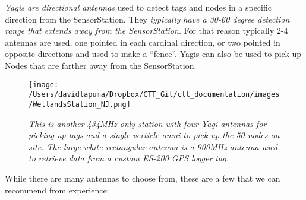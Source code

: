 \documentclass[
]{article}
\begin{document}
\emph{Yagis are directional antennas} used to detect tags and nodes in a
specific direction from the SensorStation. They \emph{typically have a
30-60 degree detection range that extends away from the SensorStation}.
For that reason typically 2-4 antennas are used, one pointed in each
cardinal direction, or two pointed in opposite directions and used to
make a ``fence''. Yagis can also be used to pick up Nodes that are
farther away from the SensorStation.

\begin{figure}
\hypertarget{id}{%
\centering
\texttt{[image: /Users/davidlapuma/Dropbox/CTT\_Git/ctt\_documentation/images/WetlandsStation\_NJ.png]}
\caption{\emph{This is another 434MHz-only station with four Yagi
antennas for picking up tags and a single verticle omni to pick up the
50 nodes on site. The large white rectangular antenna is a 900MHz
antenna used to retrieve data from a custom ES-200 GPS logger
tag.}}\label{id}
}
\end{figure}

While there are many antennas to choose from, these are a few that we
can recommend from experience:
\end{document}
